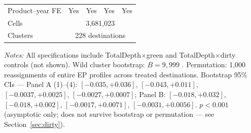 \begin{threeparttable}
\begin{tabular}{lcccc}
Product--year FE & Yes & Yes & Yes & Yes \\
Cells & \multicolumn{4}{c}{3,681,023} \\
Clusters & \multicolumn{4}{c}{228 destinations} \\
\bottomrule
\end{tabular}
\begin{tablenotes}\footnotesize
\item \emph{Notes:} All specifications include TotalDepth$\times$green and TotalDepth$\times$dirty controls (not shown). Wild cluster bootstrap: $B = 9{,}999$ \citep{cameron2008,roodman2019}. Permutation: 1{,}000 reassignments of entire EP profiles across treated destinations. Bootstrap 95\% CIs --- Panel A (1)--(4): $[-0.035,+0.036]$, $[-0.043,+0.011]$, $[-0.0037,+0.0025]$, $[-0.0027,+0.0007]$; Panel B: $[-0.018,+0.032]$, $[-0.018,+0.002]$, $[-0.0017,+0.0071]$, $[-0.0031,+0.0056]$. \sym{***} $p<0.001$ (asymptotic only; does not survive bootstrap or permutation --- see Section~\ref{sec:dirty}).
\end{tablenotes}
\end{threeparttable}
